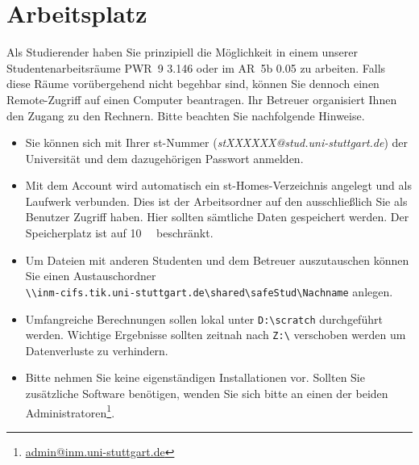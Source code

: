 \chapter{Arbeitsplatz}

Als Studierender haben Sie prinzipiell die Möglichkeit in einem unserer Studentenarbeitsräume PWR~9 3.146 oder im AR~5b 0.05 zu arbeiten. Falls diese Räume vorübergehend nicht begehbar sind, können Sie dennoch einen Remote-Zugriff auf einen Computer beantragen. Ihr Betreuer organisiert Ihnen den Zugang zu den Rechnern. Bitte beachten Sie nachfolgende Hinweise.

\begin{itemize}
\item Sie können sich mit Ihrer st-Nummer (\emph{stXXXXXX@stud.uni-stuttgart.de}) der Universität und dem dazugehörigen Passwort anmelden.

\item Mit dem Account wird automatisch ein st-Homes-Verzeichnis angelegt und als Laufwerk verbunden. Dies ist der Arbeitsordner auf den ausschließlich Sie als Benutzer Zugriff haben. Hier sollten sämtliche Daten gespeichert werden. Der Speicherplatz ist auf \SI{10}{\giga\byte} beschränkt.
\item Um Dateien mit anderen Studenten und dem Betreuer auszutauschen können Sie einen Austauschordner\\ \verb"\\inm-cifs.tik.uni‐stuttgart.de\shared\safeStud\Nachname" anlegen.
\item Umfangreiche Berechnungen sollen lokal unter \verb"D:\scratch" durchgeführt werden. Wichtige Ergebnisse sollten zeitnah nach \verb"Z:\" verschoben werden um Datenverluste zu verhindern.
\item Bitte nehmen Sie keine eigenständigen Installationen vor. Sollten Sie zusätzliche Software benötigen, wenden Sie sich bitte an einen der beiden Administratoren\footnote{\href{mailto:admin@inm.uni-stuttgart.de}{admin@inm.uni-stuttgart.de}}.
\end{itemize}



